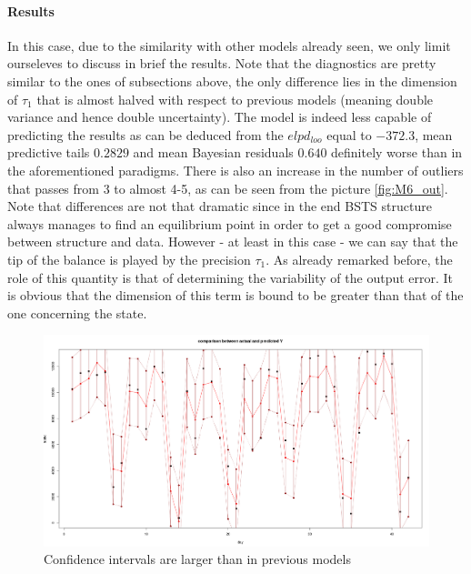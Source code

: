 \documentclass[11pt,twoside]{report}
\begin{document}
\paragraph{Results} In this case, due to the similarity with other models already seen, we only limit ourseleves to discuss in brief the results. Note that the diagnostics are pretty similar to the ones of subsections above, the only difference lies in the dimension of $ \tau_1 $ that is almost halved with respect to previous models (meaning double variance and hence double uncertainty). The model is indeed less capable of predicting the results as can be deduced from the $ elpd_{loo} $ equal to $ -372.3 $, mean predictive tails $ 0.2829 $ and mean Bayesian residuals $ 0.640  $ definitely worse than in the aforementioned paradigms. There is also an increase in the number of outliers that passes from 3 to almost 4-5, as can be seen from the picture \ref{fig:M6_out}.
Note that differences are not that dramatic since in the end BSTS structure always manages to find an equilibrium point in order to get a good compromise between structure and data. However - at least in this case - we can say that the tip of the balance is played by the precision $ \tau_1 $. As already remarked before, the role of this quantity is that of determining the variability of the output error. It is obvious that the dimension of this term is bound to be greater than that of the one concerning the state.
 
 \begin{figure}[H]
 	\centering
 	\includegraphics[width=150 mm]{pictures/m6_p1.png}
 	\caption{Confidence intervals are larger than in previous models}
 	\label{fig:M6_p1}
 \end{figure}
\end{document}
